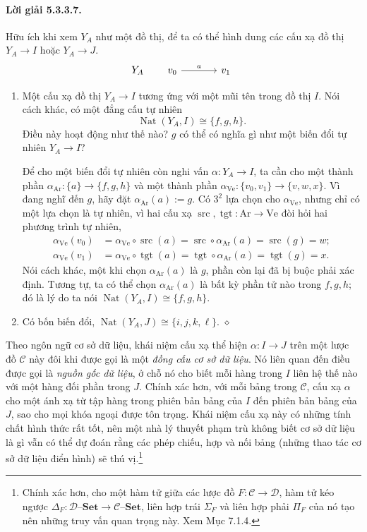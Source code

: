 \paragraph{Lời giải 5.3.3.7.} Hữu ích khi xem $Y_A$ như một đồ thị, để ta có thể hình dung các cấu xạ đồ thị $Y_A\to I$ hoặc $Y_A\to J$.
\[Y_A\qquad\begin{tikzcd}[column sep=large]v_0\arrow[r,"a"]&v_1\end{tikzcd}\]
\begin{enumerate}[label=\alph*.]
\item Một cấu xạ đồ thị $Y_A\to I$ tương ứng với một mũi tên trong đồ thị $I$. Nói cách khác, có một đẳng cấu tự nhiên
\[\operatorname{Nat}(Y_A,I)\cong\{f,g,h\}.\]
Điều này hoạt động như thế nào? $g$ có thể có nghĩa gì như một biến đổi tự nhiên $Y_A\to I$?

Để cho một biến đổi tự nhiên còn nghi vấn $\alpha:Y_A\to I$, ta cần cho một thành phần $\alpha_{\mathrm{Ar}}:\{a\}\to\{f,g,h\}$ và một thành phần $\alpha_{\mathrm{Ve}}:\{v_0,v_1\}\to\{v,w,x\}$. Vì đang nghĩ đến $g$, hãy đặt $\alpha_{\mathrm{Ar}}(a):=g$. Có $3^2$ lựa chọn cho $\alpha_{\mathrm{Ve}}$, nhưng chỉ có một lựa chọn là tự nhiên, vì hai cấu xạ $\operatorname{src},\operatorname{tgt}:\mathrm{Ar}\to\mathrm{Ve}$ đòi hỏi hai phương trình tự nhiên,
\[\begin{aligned}
\alpha_{\mathrm{Ve}}(v_0)&=\alpha_{\mathrm{Ve}}\circ\operatorname{src}(a)=\operatorname{src}\circ\alpha_{\mathrm{Ar}}(a)=\operatorname{src}(g)=w;\\
\alpha_{\mathrm{Ve}}(v_1)&=\alpha_{\mathrm{Ve}}\circ\operatorname{tgt}(a)=\operatorname{tgt}\circ\alpha_{\mathrm{Ar}}(a)=\operatorname{tgt}(g)=x.
\end{aligned}\]
Nói cách khác, một khi chọn $\alpha_{\mathrm{Ar}}(a)$ là $g$, phần còn lại đã bị buộc phải xác định. Tương tự, ta có thể chọn $\alpha_{\mathrm{Ar}}(a)$ là bất kỳ phần tử nào trong $f,g,h$; đó là lý do ta nói $\operatorname{Nat}(Y_A,I)\cong\{f,g,h\}$.
\item Có bốn biến đổi, $\operatorname{Nat}(Y_A,J)\cong\{i,j,k,\ell\}$.
\nobreak\hfill$\diamond$
\end{enumerate}

Theo ngôn ngữ cơ sở dữ liệu, khái niệm cấu xạ thể hiện $\alpha:I\to J$ trên một lược đồ $\mathcal C$ này đôi khi được gọi là một \emph{đồng cấu cơ sở dữ liệu}. Nó liên quan đến điều được gọi là \emph{nguồn gốc dữ liệu}, ở chỗ nó cho biết mỗi hàng trong $I$ liên hệ thế nào với một hàng đối phần trong $J$. Chính xác hơn, với mỗi bảng trong $\mathcal C$, cấu xạ $\alpha$ cho một ánh xạ từ tập hàng trong phiên bản bảng của $I$ đến phiên bản bảng của $J$, sao cho mọi khóa ngoại được tôn trọng. Khái niệm cấu xạ này có những tính chất hình thức rất tốt, nên một nhà lý thuyết phạm trù không biết cơ sở dữ liệu là gì vẫn có thể dự đoán rằng các phép chiếu, hợp và nối bảng (những thao tác cơ sở dữ liệu điển hình) sẽ thú vị.\footnote{Chính xác hơn, cho một hàm tử giữa các lược đồ $F:\mathcal C\to\mathcal D$, hàm tử kéo ngược $\Delta_F:\mathcal D\text{--}\mathbf{Set}\to\mathcal C\text{--}\mathbf{Set}$, liên hợp trái $\Sigma_F$ và liên hợp phải $\Pi_F$ của nó tạo nên những truy vấn quan trọng này. Xem Mục 7.1.4.}
